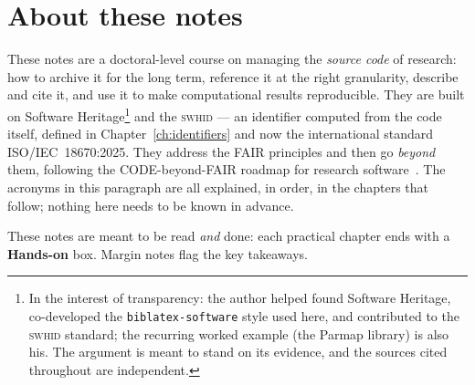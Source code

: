 \documentclass[11pt,oneside]{memoir}
\begin{document}
\swhtitlepage

\chapter*{About these notes}
These notes are a doctoral-level course on managing the \emph{source code} of research:
how to archive it for the long term, reference it at the right granularity, describe and
cite it, and use it to make computational results reproducible. They are built on Software
Heritage\footnote{In the interest of transparency: the author helped found Software Heritage,
co-developed the \texttt{biblatex-software} style used here, and contributed to the \textsc{swhid}
standard; the recurring worked example (the Parmap library) is also his. The argument is meant to
stand on its evidence, and the sources cited throughout are independent.} and the \textsc{swhid} ---
an identifier computed from the code itself, defined in Chapter~\ref{ch:identifiers} and now the
international standard ISO/IEC~18670:2025. They address
the FAIR principles and then go \emph{beyond} them, following the CODE-beyond-FAIR roadmap for
research software~\autocite{NatureSD2026}. The acronyms in this paragraph are all explained, in
order, in the chapters that follow; nothing here needs to be known in advance.

These notes are meant to be read \emph{and} done: each practical chapter ends with a
\textbf{Hands-on} box. Margin notes flag the key takeaways.
\end{document}
